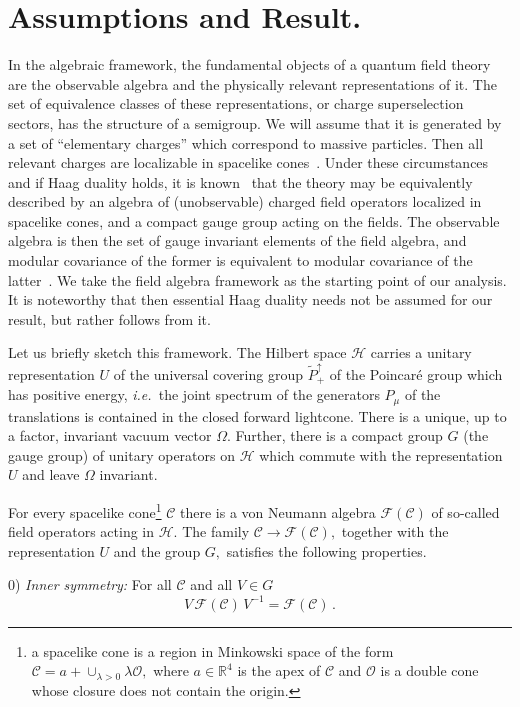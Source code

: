 \documentclass[a4paper,reqno,11pt]{amsart}
\theoremstyle{plain}
\theoremstyle{definition}
\numberwithin{equation}{section}
\newcommand{\Bb}{\mathbb{R}}
\newcommand{\F}{{\mathcal F}}
\newcommand{\calH}{{\mathcal H}}
\newcommand{\calO}{{\mathcal O}}
\newcommand{\calC}{{\mathcal C}}
\newcommand{\Potild}{\tilde{P}_+^{\uparrow}}
\newcommand{\cone}{\calC}   %
\begin{document}
\section{Assumptions and Result.}  \label{secAssRes} 
In the algebraic framework, the fundamental objects of a quantum field
theory are the observable algebra and the  physically relevant 
representations of it. The set of  equivalence classes of these 
representations, or charge superselection sectors, has the structure
of a semigroup. 
We will assume that it is generated by a set of 
``elementary charges'' which correspond to massive particles. 
Then all relevant charges are localizable in spacelike
cones~\cite{BuF}. Under these circumstances and if Haag duality holds, 
it is known~\cite{DR90} that the theory may be equivalently described
by an algebra of (unobservable) charged field operators localized in
spacelike cones, and a compact gauge group acting on the fields. 
The observable algebra is then the set of gauge invariant elements of 
the field algebra, and modular covariance of the former
is equivalent to modular covariance of the latter~\cite{Kuck,GL}. 
We take the field algebra framework as the starting point of our
analysis. It is noteworthy that then essential Haag duality 
needs not be assumed for our result, but rather follows from it. 

Let us briefly sketch this framework. 
The Hilbert space   
$\calH$ carries a unitary representation $U$ of the universal covering group 
$\Potild$ of the Poincar\'e group which has positive energy, {\it
  i.e.\ }the joint spectrum of the generators $P_\mu$ of the translations is
contained in the closed forward lightcone. There is a unique, up to a
factor,  invariant vacuum vector $\Omega.$  Further, there is a
compact group $G$ (the gauge group) of unitary operators on $\calH$
which commute with the representation $U$ and leave $\Omega$
invariant. 

For every spacelike cone\footnote{a spacelike cone is a region in
  Minkowski space of the form $\cone=a+\cup_{\lambda>0}\lambda \calO,$ where
  $a\in\Bb^4$ is the apex of $\cone$ and $\calO$ is a double cone whose
  closure does not contain the origin.} 
$\cone$ there is a von Neumann algebra $\F(\cone)$ of so-called field 
operators acting in $\calH.$ 
The family $\cone\rightarrow\F(\cone),$
together with the representation $U$ and the group $G,$ 
satisfies the following properties. 

 0) {\em Inner symmetry:} For all $\cone$ and all $V\in G$ 
\[ V\,\F(\cone)\,V^{-1} =\F(\cone)\,.   \]
\end{document}
